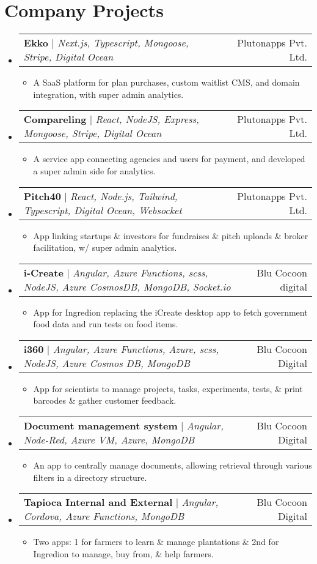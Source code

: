 \documentclass[letterpaper,10.5pt]{article}
\makeatletter
\newcommand{\resumeItem}[1]{
  \item\small{
    {#1 \vspace{-2pt}}
  }
}
\newcommand{\resumeProjectHeading}[2]{
    \item
    \begin{tabular*}{0.97\textwidth}{l@{\extracolsep{\fill}}r}
      \small#1 & #2 \\
    \end{tabular*}\vspace{-7pt}
}
\newcommand{\resumeSubHeadingListStart}{\begin{itemize}[leftmargin=0.15in, label={}]}
\newcommand{\resumeSubHeadingListEnd}{\end{itemize}}
\newcommand{\resumeItemListStart}{\begin{itemize}}
\newcommand{\resumeItemListEnd}{\end{itemize}\vspace{-5pt}}
\makeatother
\begin{document}
    \section{Company Projects}
    \resumeSubHeadingListStart
      \resumeProjectHeading
          {\textbf{Ekko} $|$ \emph{Next.js, Typescript, Mongoose, Stripe, Digital Ocean}}{Plutonapps Pvt. Ltd.}
          \resumeItemListStart
            \resumeItem{A SaaS platform for plan purchases, custom waitlist CMS, and domain integration, with super admin analytics.}
          \resumeItemListEnd
      \resumeProjectHeading
          {\textbf{Compareling} $|$ \emph{React, NodeJS, Express, Mongoose, Stripe, Digital Ocean}}{Plutonapps Pvt. Ltd.}
          \resumeItemListStart
            \resumeItem{A service app connecting agencies and users for payment, and developed a super admin side for analytics.} 
          \resumeItemListEnd
           \resumeProjectHeading
          {\textbf{Pitch40} $|$ \emph{React, Node.js, Tailwind, Typescript, Digital Ocean, Websocket}}{Plutonapps Pvt. Ltd.}
          \resumeItemListStart
          \resumeItem{App linking startups \& investors for fundraises \& pitch uploads \& broker facilitation, w/ super admin analytics.}
          \resumeItemListEnd
          \resumeProjectHeading
          {\textbf{i-Create} $|$ \emph{Angular, Azure Functions, scss, NodeJS, Azure CosmosDB, MongoDB, Socket.io}}{Blu Cocoon digital}
          \resumeItemListStart
            \resumeItem{App for Ingredion replacing the iCreate desktop app to fetch government food data and run tests on food items.}
          \resumeItemListEnd   
          \resumeProjectHeading
          {\textbf{i360} $|$ \emph{Angular, Azure Functions, Azure, scss, NodeJS, Azure Cosmos DB, MongoDB}}{Blu Cocoon Digital}
          \resumeItemListStart
            \resumeItem{App for scientists to manage projects, tasks, experiments, tests, \& print barcodes \& gather customer feedback.}
          \resumeItemListEnd
          \resumeProjectHeading
          {\textbf{Document management system} $|$ \emph{Angular, Node-Red, Azure VM, Azure, MongoDB}}{Blu Cocoon Digital}
          \resumeItemListStart
            \resumeItem{An app to centrally manage documents, allowing retrieval through various filters in a directory structure.}
          \resumeItemListEnd
    
       \resumeProjectHeading
  {\textbf{Tapioca Internal and External} $|$ \emph{Angular, Cordova, Azure Functions, MongoDB}}{Blu Cocoon Digital}
  \resumeItemListStart
    \resumeItem{Two apps: 1 for farmers to learn \& manage plantations \& 2nd for Ingredion to manage, buy from, \& help farmers.}
  \resumeItemListEnd
    \resumeSubHeadingListEnd
\end{document}
